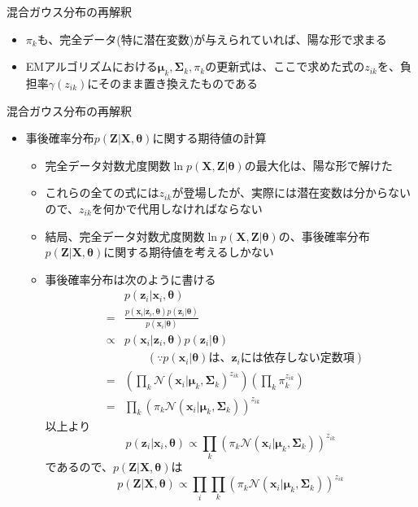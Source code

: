\documentclass[dvipdfmx,notheorems,t]{beamer}
\begin{document}
\begin{frame}{混合ガウス分布の再解釈}
\begin{itemize}
\begin{itemize}
		\item $\pi_k$も、完全データ(特に潜在変数)が与えられていれば、陽な形で求まる
		\item EMアルゴリズムにおける$\bm{\mu}_k, \bm{\Sigma}_k, \pi_k$の更新式は、ここで求めた式の$z_{ik}$を、負担率$\gamma(z_{ik})$にそのまま置き換えたものである
	\end{itemize}
\end{itemize}

\end{frame}

\begin{frame}{混合ガウス分布の再解釈}

\begin{itemize}
	\item 事後確率分布$p(\bm{Z} | \bm{X}, \bm{\theta})$に関する期待値の計算
	\begin{itemize}
		\item 完全データ対数尤度関数$\ln p(\bm{X}, \bm{Z} | \bm{\theta})$の最大化は、陽な形で解けた
		\item これらの全ての式には$z_{ik}$が登場したが、実際には\alert{潜在変数は分からない}ので、$z_{ik}$を何かで代用しなければならない
		\newline
		\item 結局、完全データ対数尤度関数$\ln p(\bm{X}, \bm{Z} | \bm{\theta})$の、事後確率分布$p(\bm{Z} | \bm{X}, \bm{\theta})$に関する期待値を考えるしかない
		\newline
		\item 事後確率分布は次のように書ける
		\begin{eqnarray}
			&& p(\bm{z}_i | \bm{x}_i, \bm{\theta}) \nonumber \\
			&=& \frac{p(\bm{x}_i | \bm{z}_i, \bm{\theta}) p(\bm{z}_i | \bm{\theta})}{p(\bm{x}_i | \bm{\theta})} \\
			&\propto& p(\bm{x}_i | \bm{z}_i, \bm{\theta}) p(\bm{z}_i | \bm{\theta}) \\
			&& \qquad (\because \text{$p(\bm{x}_i | \bm{\theta})$は、$\bm{z}_i$には依存しない定数項}) \nonumber \\
			&=& \left( \prod_k \mathcal{N}(\bm{x}_i | \bm{\mu}_k, \bm{\Sigma}_k)^{z_{ik}} \right) \left( \prod_k \pi_{k}^{z_{ik}} \right) \nonumber \\
			&=& \prod_k \left( \pi_k \mathcal{N}(\bm{x}_i | \bm{\mu}_k, \bm{\Sigma}_k) \right)^{z_{ik}}
		\end{eqnarray}
		以上より
		\begin{equation}
			p(\bm{z}_i | \bm{x}_i, \bm{\theta}) \propto \prod_k \left( \pi_k \mathcal{N}(\bm{x}_i | \bm{\mu}_k, \bm{\Sigma}_k) \right)^{z_{ik}}
		\end{equation}
		であるので、$p(\bm{Z} | \bm{X}, \bm{\theta})$は
		\begin{equation}
			p(\bm{Z} | \bm{X}, \bm{\theta}) \propto \prod_i \prod_k \left( \pi_k \mathcal{N}(\bm{x}_i | \bm{\mu}_k, \bm{\Sigma}_k) \right)^{z_{ik}}
		\end{equation}
		

\end{itemize}
\end{itemize}
\end{frame}
\end{document}

